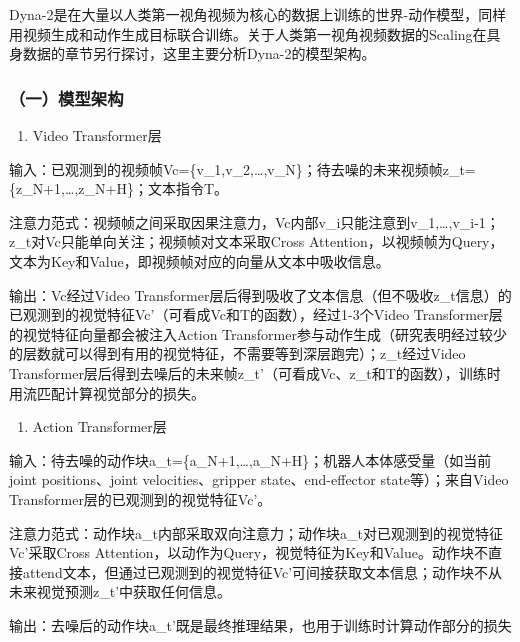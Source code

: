Dyna-2是在大量以人类第一视角视频为核心的数据上训练的世界-动作模型，同样用视频生成和动作生成目标联合训练。关于人类第一视角视频数据的Scaling在具身数据的章节另行探讨，这里主要分析Dyna-2的模型架构。

\hypertarget{ux4e00ux6a21ux578bux67b6ux6784-2}{%
\subsubsection{（一）模型架构}\label{ux4e00ux6a21ux578bux67b6ux6784-2}}

\begin{enumerate}
\def\labelenumi{\arabic{enumi}.}
\tightlist
\item
  Video Transformer层
\end{enumerate}

输入：已观测到的视频帧Vc=\{v\_1,v\_2,\ldots,v\_N\}；待去噪的未来视频帧z\_t=\{z\_N+1,\ldots,z\_N+H\}；文本指令T。

注意力范式：视频帧之间采取因果注意力，Vc内部v\_i只能注意到v\_1,\ldots,v\_i-1；z\_t对Vc只能单向关注；视频帧对文本采取Cross Attention，以视频帧为Query，文本为Key和Value，即视频帧对应的向量从文本中吸收信息。

输出：Vc经过Video Transformer层后得到吸收了文本信息（但不吸收z\_t信息）的已观测到的视觉特征Vc'（可看成Vc和T的函数），经过1-3个Video Transformer层的视觉特征向量都会被注入Action Transformer参与动作生成（研究表明经过较少的层数就可以得到有用的视觉特征，不需要等到深层跑完）；z\_t经过Video Transformer层后得到去噪后的未来帧z\_t'（可看成Vc、z\_t和T的函数），训练时用流匹配计算视觉部分的损失。

\begin{enumerate}
\def\labelenumi{\arabic{enumi}.}
\setcounter{enumi}{1}
\tightlist
\item
  Action Transformer层
\end{enumerate}

输入：待去噪的动作块a\_t=\{a\_N+1,\ldots,a\_N+H\}；机器人本体感受量（如当前joint positions、joint velocities、gripper state、end-effector state等）；来自Video Transformer层的已观测到的视觉特征Vc'。

注意力范式：动作块a\_t内部采取双向注意力；动作块a\_t对已观测到的视觉特征Vc'采取Cross Attention，以动作为Query，视觉特征为Key和Value。动作块不直接attend文本，但通过已观测到的视觉特征Vc'可间接获取文本信息；动作块不从未来视觉预测z\_t'中获取任何信息。

输出：去噪后的动作块a\_t'既是最终推理结果，也用于训练时计算动作部分的损失

